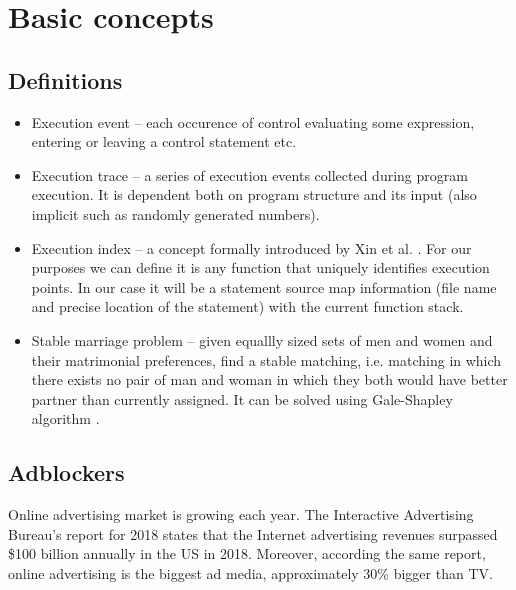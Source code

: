 \chapter{Basic concepts}

\section{Definitions}

\begin{itemize}
  \item Execution event -- each occurence of control evaluating some expression, entering or leaving a control statement etc.
  \item Execution trace -- a series of execution events collected during program execution. 
           It is dependent both on program structure and its input (also implicit such as randomly generated numbers).
  \item Execution index -- a concept formally introduced by Xin et al. \cite{sigplan:execution-indexing}. 
                                         For our purposes we can define it is any function that uniquely identifies execution points. In our case it will
                                         be a statement source map information (file name and precise location of the statement) 
                                         with the current function stack.
  \item Stable marriage problem -- given equallly sized sets of men and women and their matrimonial preferences,
                                                       find a stable matching, i.e. matching in which there exists no pair of man and woman 
                                                       in which they both would have better partner than currently assigned.
                                                       It can be solved using Gale-Shapley algorithm \cite{wiki:smp}.
\end{itemize}


\section{Adblockers}

Online advertising market is growing each year. The Interactive Advertising Bureau's report for 2018 \cite{iab:2018-report}
states that the Internet advertising revenues surpassed \$100 billion annually in the US in 2018. Moreover, according the same report,
online advertising is the biggest ad media, approximately 30\% bigger than TV.

